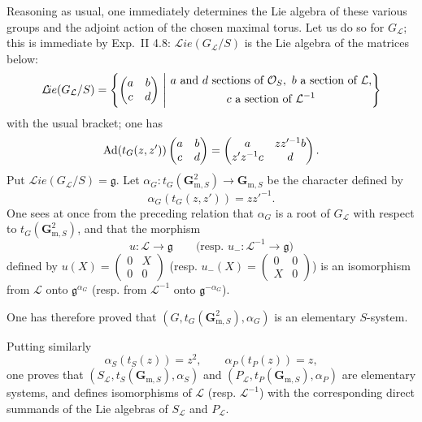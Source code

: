  Reasoning as usual, one immediately determines the Lie algebra of these various groups and the adjoint action of the chosen maximal torus. Let us do so for $G_{\mathcal L}$; this is immediate by Exp.~II 4.8: $\mathcal{L}\!ie(G_{\mathcal L}/S)$ is the Lie algebra of the matrices below:
\[
\mathcal{L}\!ie(G_{\mathcal L}/S)=\left\{\begin{pmatrix}a&b\\c&d\end{pmatrix}\ \middle|\
\begin{gathered}a\text{ and }d\text{ sections of }\mathcal{O}_S,\ b\text{ a section of }\mathcal L,\\c\text{ a section of }\mathcal L^{-1}\end{gathered}\right\}
\]
with the usual bracket; one has
\[
\operatorname{Ad}(t_G(z,z'))\begin{pmatrix}a&b\\c&d\end{pmatrix}=\begin{pmatrix}a&zz'^{-1}b\\z'z^{-1}c&d\end{pmatrix}.
\]
Put $\mathcal{L}\!ie(G_{\mathcal L}/S)=\mathfrak g$. Let $\alpha_G:t_G(\mathbf G_{\mathrm m,S}^2)\to\mathbf G_{\mathrm m,S}$ be the character defined by
\[
\alpha_G(t_G(z,z'))=zz'^{-1}.
\]
One sees at once from the preceding relation that $\alpha_G$ is a root of $G_{\mathcal L}$ with respect to $t_G(\mathbf G_{\mathrm m,S}^2)$, and that the morphism
\[
u:\mathcal L\to\mathfrak g\qquad\text{(resp. }u_-:\mathcal L^{-1}\to\mathfrak g\text{)}
\]
defined by $u(X)=\left(\begin{smallmatrix}0&X\\0&0\end{smallmatrix}\right)$ (resp. $u_-(X)=\left(\begin{smallmatrix}0&0\\X&0\end{smallmatrix}\right)$) is an isomorphism from $\mathcal L$ onto $\mathfrak g^{\alpha_G}$ (resp. from $\mathcal L^{-1}$ onto $\mathfrak g^{-\alpha_G}$).

One has therefore proved that $(G,t_G(\mathbf G_{\mathrm m,S}^2),\alpha_G)$ is an elementary $S$-system.

Putting similarly
\[
\alpha_S(t_S(z))=z^2,\qquad\alpha_P(t_P(z))=z,
\]
one proves that $(S_{\mathcal L},t_S(\mathbf G_{\mathrm m,S}),\alpha_S)$ and $(P_{\mathcal L},t_P(\mathbf G_{\mathrm m,S}),\alpha_P)$ are elementary systems, and defines isomorphisms of $\mathcal L$ (resp. $\mathcal L^{-1}$) with the corresponding direct summands of the Lie algebras of $S_{\mathcal L}$ and $P_{\mathcal L}$.

